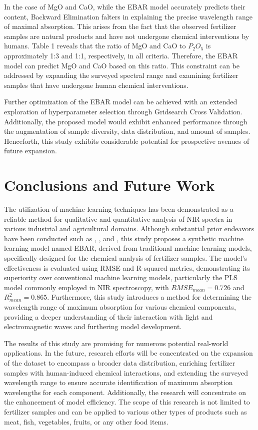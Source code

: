 \documentclass[10pt, a4paper, oneside]{article}
\begin{document}
In the case of MgO and CaO, while the EBAR model accurately predicts their content, Backward Elimination falters in explaining the precise wavelength range of maximal absorption. This arises from the fact that the observed fertilizer samples are natural products and have not undergone chemical interventions by humans. Table 1 reveals that the ratio of MgO and CaO to \(P_2O_5\) is approximately 1:3 and 1:1, respectively, in all criteria. Therefore, the EBAR model can predict MgO and CaO based on this ratio. This constraint can be addressed by expanding the surveyed spectral range and examining fertilizer samples that have undergone human chemical interventions.

Further optimization of the EBAR model can be achieved with an extended exploration of hyperparameter selection through Gridsearch Cross Validation. Additionally, the proposed model would exhibit enhanced performance through the augmentation of sample diversity, data distribution, and amount of samples. Henceforth, this study exhibits considerable potential for prospective avenues of future expansion.

\section{Conclusions and Future Work}

The utilization of machine learning techniques has been demonstrated as a reliable method for qualitative and quantitative analysis of NIR spectra in various industrial and agricultural domains. Although substantial prior endeavors have been conducted such as \cite{feng2022evaluation}, \cite{huang2008evaluation}, and \cite{devianti2022near}, this study proposes a synthetic machine learning model named EBAR, derived from traditional machine learning models, specifically designed for the chemical analysis of fertilizer samples. The model's effectiveness is evaluated using RMSE and R-squared metrics, demonstrating its superiority over conventional machine learning models, particularly the PLS model commonly employed in NIR spectroscopy, with \(RMSE_{mean}=0.726\) and \(R_{mean}^2=0.865\). Furthermore, this study introduces a method for determining the wavelength range of maximum absorption for various chemical components, providing a deeper understanding of their interaction with light and electromagnetic waves and furthering model development.

The results of this study are promising for numerous potential real-world applications. In the future, research efforts will be concentrated on the expansion of the dataset to encompass a broader data distribution, enriching fertilizer samples with human-induced chemical interactions, and extending the surveyed wavelength range to ensure accurate identification of maximum absorption wavelengths for each component. Additionally, the research will concentrate on the enhancement of model efficiency. The scope of this research is not limited to fertilizer samples and can be applied to various other types of products such as meat, fish, vegetables, fruits, or any other food items.
\end{document}
